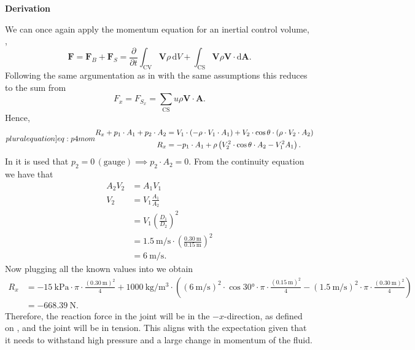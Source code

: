 \documentclass[a4paper]{article}
\renewcommand{\Vec}[1]{\boldsymbol{#1}}
\numberwithin{equation}{problem}
\newcommand{\AUheading}[1]{%
  \par\vspace{.4\baselineskip}%
  {\sffamily\bfseries\color{AUblueDark}#1\par}%
  \nobreak%
}
\newenvironment{derivation}[1][Derivation]{%
  \AUheading{#1}
  \begingroup\allowdisplaybreaks
  \setlength{\abovedisplayskip}{6pt}%
  \setlength{\belowdisplayskip}{6pt}%
  \setlength{\abovedisplayshortskip}{4pt}%
  \setlength{\belowdisplayshortskip}{4pt}%
}{\par\endgroup\medskip}
\begin{document}
\begin{derivation}
We can once again apply the momentum equation for an inertial control volume, ,
\[ 
\Vec{F} = \Vec{F}_B + \Vec{F}_S = \frac{\partial }{\partial t} \int_{\mathrm{CV}} \Vec{V} \rho \, \mathrm{d}V + \int_{\mathrm{CS}} \Vec{V} \rho \Vec{V} \cdot \mathrm{d}\Vec{A}
.\]
Following the same argumentation as in  with the same assumptions this reduces to the sum from 
\[ 
F_x = F_{S_x} = \sum_{\mathrm{CS}} u \rho \Vec{V} \cdot \Vec{A}
.\]
Hence,
\begin{subequations} \label[pluralequation]{eq:p4mom}
  \begin{align}
    R_x + p_1 \cdot A_1 + p_2 \cdot A_2 &= V_1 \cdot \left( -\rho \cdot V_1 \cdot A_1 \right) + V_2 \cdot \cos \theta \cdot \left( \rho \cdot V_2 \cdot A_2 \right) \\
    R_x &= - p_1 \cdot A_1 + \rho \left( V_2^2 \cdot \cos \theta \cdot A_2 - V_1^2 A_1 \right)  \label{eq:momp4}
  .\end{align}
\end{subequations}
In  it is used that $p_2 = 0 \, (\text{gauge}) \implies p_2 \cdot A_2 = 0$. From the continuity equation we have that
\begin{align*}
  A_2 V_2 &= A_1 V_1 \\
  V_2 &= V_1 \frac{A_1}{A_2} \\
      &= V_1 \left( \frac{D_1}{D_2} \right)^2 \\
      &= \qty{1,5}{\meter\per\second} \cdot \left( \frac{\qty{0,30}{\meter} }{\qty{0,15}{\meter}} \right)^2 \\
      &= \qty{6}{\meter\per\second} 
.\end{align*}
Now plugging all the known values into  we obtain
\begin{align*}
  R_x &= \qty{-15}{\kilo\pascal} \cdot \pi \cdot \frac{\left( \qty{0,30}{\meter}  \right)^2}{4} + \qty{1000}{\kilogram\per\cubic\meter} \cdot \left( \left( \qty{6}{\meter\per\second}  \right)^2 \cdot \cos \ang{30} \cdot \pi \cdot \frac{\left( \qty{0,15}{\meter}  \right)^2}{4} - \left( \qty{1,5}{\meter\per\second}  \right)^2 \cdot \pi \cdot \frac{\left( \qty{0,30}{\meter}  \right)^2}{4}\right) \\
      &= \qty{-668,39}{\newton} 
.\end{align*}
Therefore, the reaction force in the joint will be in the $-x$-direction, as defined on , and the joint will be in tension.
This aligns with the expectation given that it needs to withstand high pressure and a large change in momentum of the fluid.  
\end{derivation}
\end{document}
